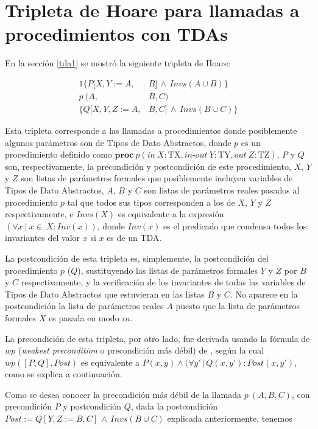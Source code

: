 \chapter{Tripleta de Hoare para llamadas a procedimientos con TDAs}
\label{derivhoare}

En la sección \ref{tda1} se mostró la siguiente tripleta de Hoare:

\begin{alignat}{1}
  \{ P[X,Y:=A,&B]\, \land \, Invs(A \cup B)\} \nonumber \\
  p\  (A,&B,C) \label{eqn:tdatriple2} \\ 
  \{ Q[X,Y,Z:=A,&B,C]\, \land \, Invs(B \cup C)\} \nonumber
\end{alignat}

Esta tripleta corresponde a las llamadas a procedimientos donde 
posiblemente algunos parámetros son de Tipos de Dato Abstractos,
donde $p$ es un procedimiento definido como
$\textbf{proc}\ p (in\ X : \textrm{TX}, in\textrm{-}out\ Y : \textrm{TY}, out\ Z : \textrm{TZ})$, $P$ y $Q$ son, respectivamente, la precondición y postcondición de este procedimiento, $X$, $Y$ y $Z$ son listas de parámetros formales que posiblemente incluyen
variables de Tipos de Dato Abstractos, $A$, $B$ y $C$ son listas de parámetros reales pasados al procedimiento $p$ tal que todos sus tipos corresponden a los de $X$, $Y$ y $Z$ respectivamente, e $Invs(X)$ es equivalente a la expresión $(\forall x\ |\ x \in\ X : Inv(x) )$, donde $Inv(x)$ es el predicado que condensa todos los
invariantes del valor $x$ si $x$ es de un TDA.

La postcondición de esta tripleta es, simplemente, la postcondición del procedimiento $p$ ($Q$), sustituyendo las listas de parámetros formales $Y$ y $Z$ por $B$ y $C$ respectivamente, y la verificación de los invariantes de todas las variables de Tipos de Dato Abstractos que estuvieran en las listas $B$ y $C$. No aparece en la postcondición la lista de parámetros reales $A$ puesto que la lista de parámetros formales $X$ es pasada en modo $in$.

La precondición de esta tripleta, por otro lado, fue derivada usando la fórmula de $wp$ (\textit{weakest precondition} o precondición más débil) de \cite{flaviani}, según la cual $wp([P, Q], Post)$ es equivalente a $P (x,y) \land (\forall y'\,|\,Q(x, y') : Post (x, y')$, como se explica a continuación.

Como se desea conocer la precondición más débil de la llamada $p\  (A,B,C)$, con precondición $P$ y postcondición $Q$, dada la postcondición $Post := Q[Y,Z:=B,C]\, \land \, Invs(B \cup C)$ explicada anteriormente, tenemos

